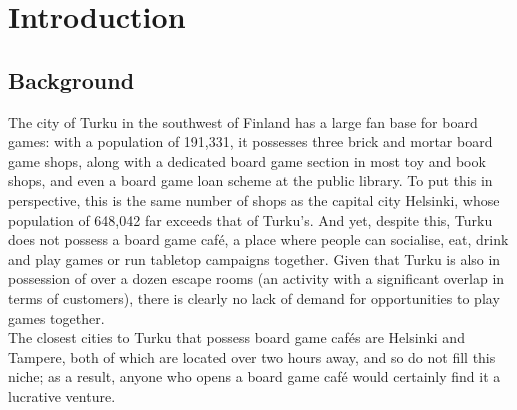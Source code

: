 \documentclass{article}
\begin{document}
    \newpage

    \tableofcontents

    \newpage

    \section{Introduction}

    \subsection{Background}

    The city of Turku in the southwest of Finland has a large fan base for board games: with a population of 191,331, it possesses three brick and mortar board game shops, along with a dedicated board game section in most toy and book shops, and even a board game loan scheme at the public library. 
    To put this in perspective, this is the same number of shops as the capital city Helsinki, whose population of 648,042 far exceeds that of Turku's. 
    And yet, despite this, Turku does not possess a board game caf\'e, a place where people can socialise, eat, drink and play games or run tabletop campaigns together. 
    Given that Turku is also in possession of over a dozen escape rooms (an activity with a significant overlap in terms of customers), there is clearly no lack of demand for opportunities to play games together.\\

    The closest cities to Turku that possess board game caf\'es are Helsinki and Tampere, both of which are located over two hours away, and so do not fill this niche; as a result, anyone who opens a board game caf\'e would certainly find it a lucrative venture.
    
\end{document}
